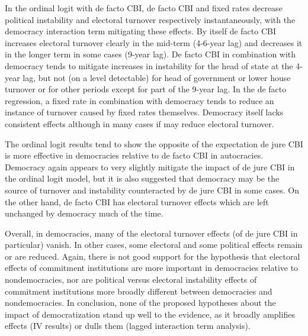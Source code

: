 \documentclass{article}
\begin{document}
    In the ordinal logit with de facto CBI, de facto CBI and fixed rates decrease political instability and electoral turnover respectively instantaneously, with the democracy interaction term mitigating these effects. By itself de facto CBI increases electoral turnover clearly in the mid-term (4-6-year lag) and decreases it in the longer term in some cases (9-year lag). De facto CBI in combination with democracy tends to mitigate increases in instability for the head of state at the 4-year lag, but not (on a level detectable) for head of government or lower house turnover or for other periods except for part of the 9-year lag. In the de facto regression, a fixed rate in combination with democracy tends to reduce an instance of turnover caused by fixed rates themselves. Democracy itself lacks consistent effects although in many cases if may reduce electoral turnover.

    The ordinal logit results tend to show the opposite of the expectation de jure CBI is more effective in democracies relative to de facto CBI in autocracies. Democracy again appears to very slightly mitigate the impact of de jure CBI in the ordinal logit model, but it is also suggested that democracy may be the source of turnover and instability counteracted by de jure CBI in some cases. On the other hand, de facto CBI has electoral turnover effects which are left unchanged by democracy much of the time.

    Overall, in democracies, many of the electoral turnover effects (of de jure CBI in particular) vanish. In other cases, some electoral and some political effects remain or are reduced. Again, there is not good support for the hypothesis that electoral effects of commitment institutions are more important in democracies relative to nondemocracies, nor are political versus electoral instability effects of commitment institutions more broadly different between democracies and nondemocracies. In conclusion, none of the proposed hypotheses about the impact of democratization stand up well to the evidence, as it broadly amplifies effects (IV results) or dulls them (lagged interaction term analysis).
\end{document}

